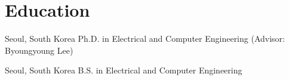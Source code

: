 \section{Education}

\begin{itemize}
        {Seoul, South Korea}
        {Ph.D. in Electrical and Computer Engineering
         (Advisor: Byoungyoung Lee)}

        {Seoul, South Korea}
        {B.S. in Electrical and Computer Engineering}
\end{itemize}

